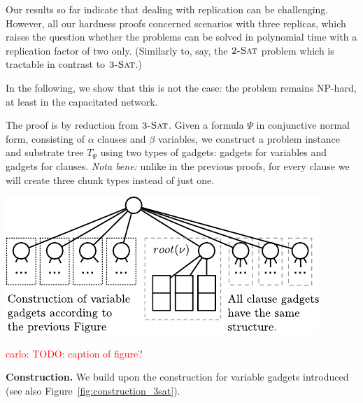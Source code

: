 \documentclass[9pt]{sigcomm-alternate}
\newcommand{\carlo}[1]{\textcolor{red}{carlo: #1}}
\newcommand{\clauses}{\alpha}
\newcommand{\vars}{\beta}
\newcommand{\TSAT}{\textsc{3-Sat}}
\newcommand{\ZSAT}{\textsc{2-Sat}}
\newcommand{\Formula}{\ensuremath{\Psi}}
\begin{document}
\begin{appendix}
Our results so far indicate that dealing with replication can be challenging.
However, all our hardness proofs concerned scenarios with three replicas,
which raises the question whether the problems can be solved in polynomial time
with a replication factor of two only. (Similarly to, say, the $\ZSAT$ problem
which is tractable in contrast to $\TSAT$.)

In the following, we show that this is not the case: the problem remains
NP-hard, at least in the capacitated network.

The proof is by reduction from $\TSAT$. Given a formula $\Formula$ in
conjunctive normal form, consisting of $\clauses$ clauses and $\vars$ variables, we construct a problem instance and substrate tree
$T_{\Formula}$ using two types of gadgets: gadgets for variables and
gadgets for clauses. \emph{Nota bene:}
unlike in the previous proofs, for every clause we will create three chunk types instead of just one.

\includegraphics{figs/construction_2replica}

\carlo{TODO: caption of figure?}

\textbf{Construction.}
We build upon the construction for variable gadgets introduced (see also Figure~\ref{fig:construction_3sat}).


\end{appendix}
\end{document}
